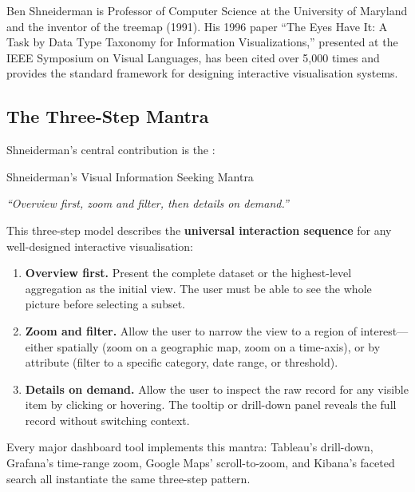 Ben Shneiderman is Professor of Computer Science at the University of
Maryland and the inventor of the treemap (1991). His 1996 paper ``The Eyes
Have It: A Task by Data Type Taxonomy for Information Visualizations,''
presented at the IEEE Symposium on Visual Languages, has been cited over
5{,}000 times and provides the standard framework for designing interactive
visualisation systems.

\subsection{The Three-Step Mantra}
\label{subsec:mantra}

Shneiderman's central contribution is the :

\begin{keyinsight}{Shneiderman's Visual Information Seeking Mantra}
\begin{center}
\large\textit{``Overview first, zoom and filter, then details on demand.''}
\end{center}
This three-step model describes the \textbf{universal interaction sequence}
for any well-designed interactive visualisation:
\begin{enumerate}
  \item \textbf{Overview first.} Present the complete dataset or the
        highest-level aggregation as the initial view. The user must
        be able to see the whole picture before selecting a subset.
  \item \textbf{Zoom and filter.} Allow the user to narrow the view to
        a region of interest---either spatially (zoom on a geographic
        map, zoom on a time-axis), or by attribute (filter to a specific
        category, date range, or threshold).
  \item \textbf{Details on demand.} Allow the user to inspect the raw
        record for any visible item by clicking or hovering. The tooltip
        or drill-down panel reveals the full record without switching context.
\end{enumerate}
Every major dashboard tool implements this mantra: Tableau's drill-down,
Grafana's time-range zoom, Google Maps' scroll-to-zoom, and Kibana's
faceted search all instantiate the same three-step pattern.
\end{keyinsight}


